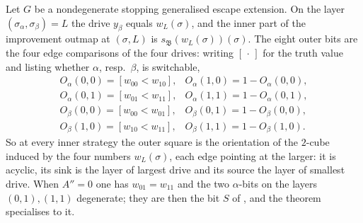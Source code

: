 \begin{theorem}\label{thm:ec-level2}
Let $G$ be a nondegenerate stopping generalised escape extension. On the layer
$(\sigma_\alpha,\sigma_\beta)=L$ the drive $y_\beta$ equals $w_L(\sigma)$, and the inner part of
the improvement outmap at $(\sigma,L)$ is $s_{\mathfrak B}(w_L(\sigma))(\sigma)$. The eight
outer bits are the four edge comparisons of the four drives: writing $[\,\cdot\,]$ for the
truth value and listing whether $\alpha$, resp.\ $\beta$, is switchable,
\[
\begin{array}{ll}
 O_\alpha(0,0)=[w_{00}<w_{10}], & O_\alpha(1,0)=1-O_\alpha(0,0),\\
 O_\alpha(0,1)=[w_{01}<w_{11}], & O_\alpha(1,1)=1-O_\alpha(0,1),\\
 O_\beta(0,0)=[w_{00}<w_{01}],  & O_\beta(0,1)=1-O_\beta(0,0),\\
 O_\beta(1,0)=[w_{10}<w_{11}],  & O_\beta(1,1)=1-O_\beta(1,0).
\end{array}
\]
So at every inner strategy the outer square is the orientation of the $2$-cube induced by the
four numbers $w_L(\sigma)$, each edge pointing at the larger: it is acyclic, its sink is the
layer of largest drive and its source the layer of smallest drive. When $A''=0$ one has
$w_{01}=w_{11}$ and the two $\alpha$-bits on the layers $(0,1),(1,1)$ degenerate; they are then
the bit $S$ of , and the theorem specialises to it.
\end{theorem}

